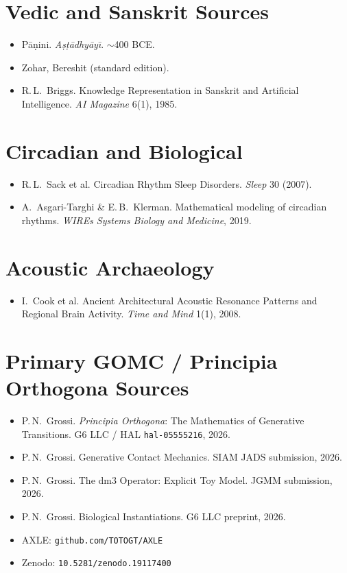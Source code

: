 \documentclass[11pt, twoside, openright]{book}
\theoremstyle{plain}
\theoremstyle{definition}
\begin{document}
\section*{Vedic and Sanskrit Sources}
\begin{itemize}[leftmargin=*]
  \item P\={a}\d{n}ini. \textit{A\d{s}\d{t}\={a}dhy\={a}y\={\i}}. $\sim$400 BCE.
  \item Zohar, Bereshit (standard edition).
  \item R.\,L.\ Briggs. Knowledge Representation in Sanskrit and
    Artificial Intelligence. \textit{AI Magazine} 6(1), 1985.
\end{itemize}

\section*{Circadian and Biological}
\begin{itemize}[leftmargin=*]
  \item R.\,L.\ Sack et al. Circadian Rhythm Sleep Disorders.
    \textit{Sleep} 30 (2007).
  \item A.\ Asgari-Targhi \& E.\,B.\ Klerman. Mathematical modeling of
    circadian rhythms. \textit{WIREs Systems Biology and Medicine}, 2019.
\end{itemize}

\section*{Acoustic Archaeology}
\begin{itemize}[leftmargin=*]
  \item I.\ Cook et al. Ancient Architectural Acoustic Resonance Patterns
    and Regional Brain Activity. \textit{Time and Mind} 1(1), 2008.
\end{itemize}

\section*{Primary GOMC / Principia Orthogona Sources}
\begin{itemize}[leftmargin=*]
  \item P.\,N.\ Grossi. \textit{Principia Orthogona}: The Mathematics
    of Generative Transitions. G6 LLC / HAL \texttt{hal-05555216}, 2026.
  \item P.\,N.\ Grossi. Generative Contact Mechanics. SIAM JADS
    submission, 2026.
  \item P.\,N.\ Grossi. The dm3 Operator: Explicit Toy Model.
    JGMM submission, 2026.
  \item P.\,N.\ Grossi. Biological Instantiations. G6 LLC preprint, 2026.
  \item AXLE: \texttt{github.com/TOTOGT/AXLE}
  \item Zenodo: \texttt{10.5281/zenodo.19117400}
\end{itemize}
\end{document}
